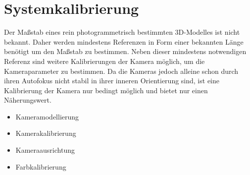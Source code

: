\documentclass[./00PhotoBox.tex]{subfiles}
\begin{document}
\chapter{Systemkalibrierung}
Der Maßstab eines rein photogrammetrisch bestimmten 3D-Modelles ist nicht bekannt. Daher werden mindestens Referenzen in Form einer bekannten Länge benötigt um den Maßstab zu bestimmen. Neben dieser mindestens notwendigen Referenz sind weitere Kalibrierungen der Kamera möglich, um die Kameraparameter zu bestimmen. Da die Kameras jedoch alleine schon durch ihren Autofokus nicht stabil in ihrer inneren Orientierung sind, ist eine Kalibrierung der Kamera nur bedingt möglich und bietet nur einen Näherungswert.

\begin{itemize}
    \item Kameramodellierung
    \item Kamerakalibrierung
    \item Kameraausrichtung
    \item Farbkalibrierung
\end{itemize}

\biblio
\end{document}
